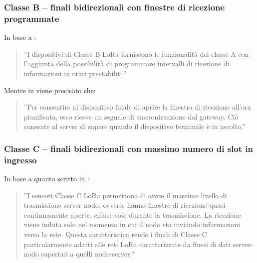 \documentclass[a4paper]{report} %
\begin{document}
\subsubsection{Classe B – finali bidirezionali con finestre di ricezione programmate}
In base a \cite{art:rif.27}:
\begin{quote}
	''I dispositivi di Classe B LoRa forniscono le funzionalità dei classe A con l’aggiunta della possibilità di programmare intervalli di ricezione di informazioni in orari prestabiliti.'' 
\end{quote}
Mentre in \cite{art:rif.31} viene precisato che:
\begin{quote}
	''Per consentire al dispositivo finale di aprire la finestra di ricezione all'ora pianificata, esso riceve un segnale di sincronizzazione dal gateway. Ciò consente al server di sapere quando il dispositivo terminale è in ascolto.''
\end{quote}
\subsubsection{Classe C – finali bidirezionali con massimo numero di slot in ingresso}
In base a quanto scritto in \cite{art:rif.27}:
\begin{quote}
	''I sensori Classe C LoRa permettono di avere il massimo livello di trasmissione server-nodo, ovvero, hanno finestre di ricezione quasi continuamente aperte, chiuse solo durante la trasmissione. La ricezione viene inibita solo nel momento in cui il nodo sta inviando informazioni verso la rete. Questa caratteristica rende i finali di Classe C particolarmente adatti alle reti LoRa caratterizzate da flussi di dati server-nodo superiori a quelli nodo-server.''
\end{quote}

\end{document}
